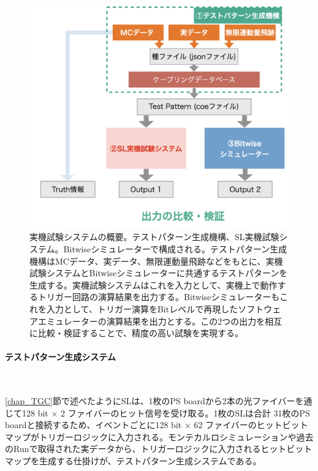 \begin{figure} 
\centering
\includegraphics[width=16cm]{fig/Test/Test_system.png}
\caption[実機試験システムの概要]{実機試験システムの概要。テストパターン生成機構、SL実機試験システム。Bitwiseシミュレーターで構成される。テストパターン生成機構はMCデータ、実データ、無限運動量飛跡などをもとに、実機試験システムとBitwiseシミュレーターに共通するテストパターンを生成する。実機試験システムはこれを入力として、実機上で動作するトリガー回路の演算結果を出力する。Bitwiseシミュレーターもこれを入力として、トリガー演算をBitレベルで再現したソフトウェアエミュレーターの演算結果を出力とする。この2つの出力を相互に比較・検証することで、精度の高い試験を実現する。}
\label{Test_system}
\end{figure}

\paragraph{テストパターン生成システム}　　
\par
\ref{chap_TGC}節で述べたようにSLは、1枚のPS boardから2本の光ファイバーを通じて128 bit $\times$ 2 ファイバーのヒット信号を受け取る。1枚のSLは合計 31枚のPS boardと接続するため、イベントごとに128 bit $\times$ 62 ファイバーのヒットビットマップがトリガーロジックに入力される。モンテカルロシミュレーションや過去のRunで取得された実データから、トリガーロジックに入力されるヒットビットマップを生成する仕掛けが、テストパターン生成システムである。

